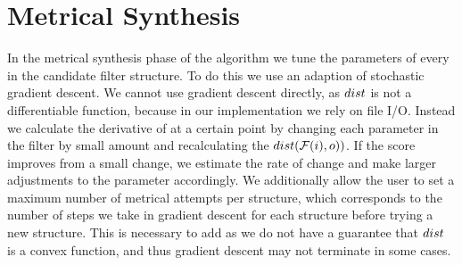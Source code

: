 \section{Metrical Synthesis}
\label{sec:opt}

In the metrical synthesis phase of the algorithm we tune the parameters of every \dspnode in the candidate filter structure.
To do this we use an adaption of stochastic gradient descent.
We cannot use gradient descent directly, as $dist$ is not a differentiable function, because in our implementation we rely on file I/O.
Instead we calculate the derivative of \distFxn at a certain point by changing each parameter in the filter by small amount and recalculating the $dist(\mathcal{F}(i),o))$.
If the score improves from a small change, we estimate the rate of change and make larger adjustments to the parameter accordingly.
We additionally allow the user to set a maximum number of metrical attempts per structure, which corresponds to the number of steps we take in gradient descent for each structure before trying a new structure.
This is necessary to add as we do not have a guarantee that $dist$ is a convex function, and thus gradient descent may not terminate in some cases.
